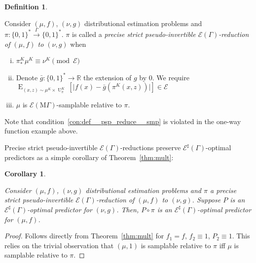 \documentclass{article}
\numberwithin{equation}{section}
\theoremstyle{definition}
\newtheorem{definition}{Definition}[section]
\theoremstyle{plain}
\newtheorem{corollary}{Corollary}[section]
\newcommand{\Bool}{\{0,1\}}
\newcommand{\Words}{{\Bool^*}}
\DeclareMathOperator{\E}{E}
\DeclareMathOperator{\Un}{U}
\newcommand{\Reals}{\mathbb{R}}
\newcommand{\Abs}[1]{\lvert #1 \rvert}
\newcommand{\MGrow}{\mathrm{M}\Gamma}
\newcommand{\Fall}{\mathcal{E}}
\newcommand{\EG}{\Fall(\Gamma)}
\newcommand{\ESG}{\Fall^\sharp(\Gamma)}
\newcommand{\EMG}{\Fall(\MGrow)}
\newcommand{\Scheme}{\xrightarrow{\Gamma}}
\begin{document}
\begin{samepage}
\begin{definition}
\label{def:psp_reduce}

Consider $(\mu,f)$, $(\nu,g)$ distributional estimation problems and ${\pi: \Words \Scheme \Words}$. $\pi$ is called a \emph{precise strict pseudo-invertible $\EG$-reduction of $(\mu,f)$ to $(\nu,g)$} when

\begin{enumerate}[(i)]

\item\label{con:def__psp_reduce__dist} $\pi_*^K\mu^{K} \equiv \nu^{K} \pmod \Fall$

\item\label{con:def__psp_reduce__fun} Denote ${\bar{g}: \Words \rightarrow \Reals}$ the extension of $g$ by 0. We require $\E_{(x,z) \sim \mu^{K} \times \Un_\pi^{K}}[\Abs{f(x)-\bar{g}(\pi^{K}(x,z))}] \in \Fall$

\item\label{con:def__psp_reduce__smp} $\mu$ is $\EMG$-samplable relative to $\pi$.

\end{enumerate}

\end{definition}
\end{samepage}

Note that condition~\ref{con:def__psp_reduce__smp} is violated in the one-way function example above.

Precise strict pseudo-invertible $\EG$-reductions preserve $\ESG$-optimal predictors as a simple corollary of Theorem~\ref{thm:mult}:

\begin{samepage}
\begin{corollary}
\label{crl:psp_reduce_sharp}

Consider $(\mu,f)$, $(\nu,g)$ distributional estimation problems and $\pi$ a precise strict pseudo-invertible $\EG$-reduction of $(\mu, f)$ to $(\nu, g)$. Suppose $P$ is an $\ESG$-optimal predictor for $(\nu, g)$. Then, $P \circ \pi$ is an $\ESG$-optimal predictor for $(\mu, f)$.

\end{corollary}
\end{samepage}

\begin{proof}

Follows directly from Theorem~\ref{thm:mult} for $f_1 = f$, ${f_2 \equiv 1}$, $P_2 \equiv 1$. This relies on the trivial observation that $(\mu, 1)$ is samplable relative to $\pi$ iff $\mu$ is samplable relative to $\pi$.
%
\end{proof}
\end{document}
